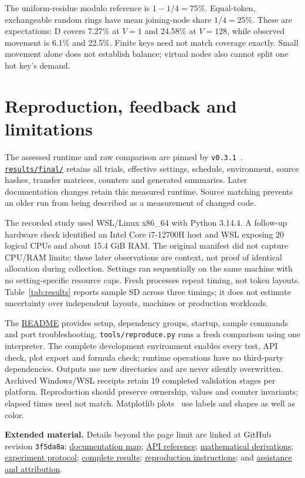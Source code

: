 \documentclass[12pt,a4paper]{article}
\newcommand{\detail}[2]{\href{https://github.com/Nvb-flipped/shared-kv-storage/blob/3f5da8a06de57b4e222b7b551b1a55b96c4cbadf/#1}{#2}}
\begin{document}
The uniform-residue modulo reference is $1-1/4=75\%$. Equal-token, exchangeable
random rings have mean joining-node share $1/4=25\%$. These are expectations:
D covers 7.27\% at $V=1$ and 24.58\% at $V=128$, while observed movement is 6.1\%
and 22.5\%. Finite keys need not match coverage exactly. Small movement alone
does not establish balance; virtual nodes also cannot split one hot key's demand.

\newpage
\section{Reproduction, feedback and limitations}
The assessed runtime and raw comparison are pinned by \texttt{v0.3.1}~\cite{project}.
\href{https://github.com/Nvb-flipped/shared-kv-storage/tree/3f5da8a06de57b4e222b7b551b1a55b96c4cbadf/results/final}{\texttt{results/final/}} retains all trials, effective settings, schedule, environment,
source hashes, transfer matrices, counters and generated summaries. Later
documentation changes retain this measured runtime. Source matching prevents an
older run from being described as a measurement of changed code.

The recorded study used WSL/Linux x86\_64 with Python 3.14.4. A follow-up hardware
check identified an Intel Core i7-12700H host and WSL exposing 20 logical CPUs
and about 15.4 GiB RAM. The original manifest did not capture CPU/RAM limits;
these later observations are context, not proof of identical allocation during
collection. Settings ran sequentially on the same machine with no setting-specific
resource caps. Fresh processes repeat timing, not token layouts. Table~\ref{tab:results}
reports sample SD across three timings; it does not estimate uncertainty over
independent layouts, machines or production workloads.

The \detail{README.md}{README} provides setup, dependency groups, startup, sample commands and port
troubleshooting. \texttt{tools/reproduce.py} runs a fresh comparison using one
interpreter. The complete development environment enables every test, API check,
plot export and formula check; runtime operations have no third-party dependencies.
Outputs use new directories and are never silently overwritten. Archived
Windows/WSL receipts retain 19 completed validation stages per platform.
Reproduction should preserve ownership, values and counter invariants; elapsed
times need not match. Matplotlib plots~\cite{matplotlib} use labels and shapes as well as color.

\textbf{Extended material.}
Details beyond the page limit are linked at GitHub revision \texttt{3f5da8a}:
\detail{docs/README.md}{documentation map};
\detail{docs/api.md}{API reference};
\detail{docs/metrics.md}{mathematical derivations};
\detail{docs/experiment-design.md}{experiment protocol};
\detail{results/final/analysis.md}{complete results};
\detail{docs/reproduction.md}{reproduction instructions}; and
\detail{docs/ai-use.md}{assistance and attribution}.
\end{document}
